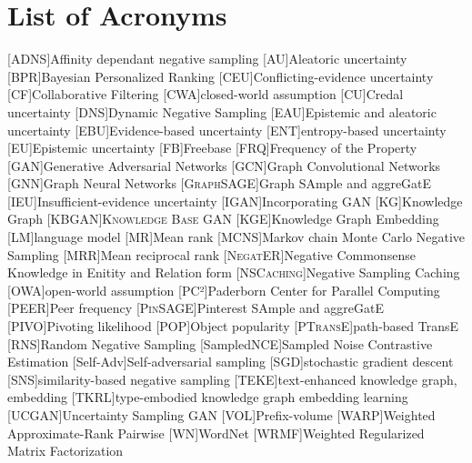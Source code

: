 \chapter{List of Acronyms}
\begin{acronym}
[\textsc{ADNS}]{Affinity dependant negative sampling}
[AU]{Aleatoric uncertainty}
[BPR]{Bayesian Personalized Ranking}
[CEU]{Conflicting-evidence uncertainty}
[CF]{Collaborative Filtering}
[CWA]{closed-world assumption}
[CU]{Credal uncertainty}
[DNS]{Dynamic Negative Sampling}
[EAU]{Epistemic and aleatoric uncertainty}
[EBU]{Evidence-based uncertainty}
[ENT]{entropy-based uncertainty}
[EU]{Epistemic uncertainty}
[\textsc{FB}]{Freebase}
[\textsc{FRQ}]{Frequency of the Property}
[GAN]{Generative Adversarial Networks}
[GCN]{Graph Convolutional Networks}
[GNN]{Graph Neural Networks}
[\textsc{GraphSAGE}]{Graph SAmple and aggreGatE}
[IEU]{Insufficient-evidence uncertainty}
[\textsc{IGAN}]{Incorporating GAN}
[KG]{Knowledge Graph}
[\textsc{KBGAN}]{\textsc{Knowledge Base GAN}}
[KGE]{Knowledge Graph Embedding}
[LM]{language model}
[MR]{Mean rank}
[\textsc{MCNS}]{Markov chain Monte Carlo Negative Sampling}
[MRR]{Mean reciprocal rank}
[\textsc{NegatER}]{Negative Commonsense Knowledge in Enitity and Relation form}
[\textsc{NSCaching}]{Negative Sampling Caching}
[OWA]{open-world assumption}
[PC²]{Paderborn Center for Parallel Computing}
[\textsc{PEER}]{Peer frequency}
[\textsc{PinSAGE}]{Pinterest SAmple and aggreGatE}
[\textsc{PIVO}]{Pivoting likelihood}
[\textsc{POP}]{Object popularity}
[\textsc{PTransE}]{path-based TransE}
[RNS]{Random Negative Sampling}
[SampledNCE]{Sampled Noise Contrastive Estimation}
[Self-Adv]{Self-adversarial sampling}
[SGD]{stochastic gradient descent}
[SNS]{similarity-based negative sampling}
[\textsc{TEKE}]{text-enhanced knowledge graph, embedding}
[\textsc{TKRL}]{type-embodied knowledge graph embedding learning}
[\textsc{UCGAN}]{Uncertainty Sampling GAN}
[\textsc{VOL}]{Prefix-volume}
[WARP]{Weighted Approximate-Rank Pairwise}
[\textsc{WN}]{WordNet}
[WRMF]{Weighted Regularized Matrix Factorization}

\end{acronym}